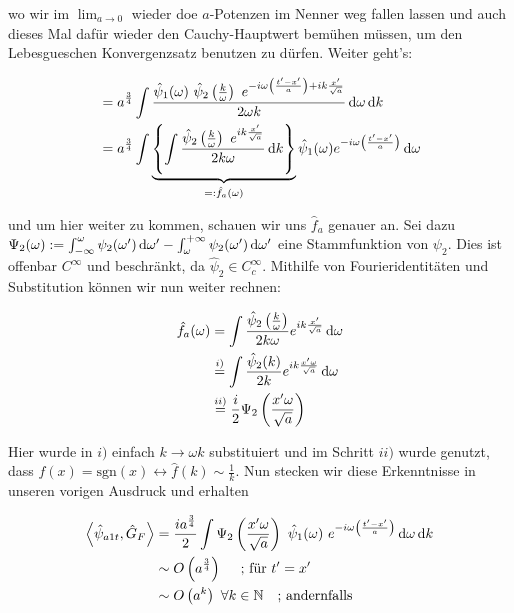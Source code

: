 wo wir im $\lim_{a \rightarrow 0}$ wieder doe $a$-Potenzen im Nenner weg fallen lassen
und auch dieses Mal dafür wieder den Cauchy-Hauptwert bemühen müssen, um den
Lebesgueschen Konvergenzsatz benutzen zu dürfen.
Weiter geht's:

\begin{align}
    &=
    a^\frac{3}{4} \int \frac{
    \hat \psi_1(\omega)
    ~\hat\psi_2 \left(\frac{k}{\omega}\right)
    ~ e^{-i \omega \left(\frac{t'-x'}{a}\right) + i k \frac{x'}{\sqrt{a}}}
    }
    {
    2\omega k
    } \mathop{}\!\mathrm{d} \omega \mathop{}\!\mathrm{d} k \nonumber \\
    &= a^\frac{3}{4} \int
    \underbrace{\left\{ \int \frac{\hat \psi_2\left(\frac{k}{\omega}\right)
        ~e^{ik\frac{x'}{\sqrt{a}}}
        }
        {
            2 k \omega
        }
        \mathop{}\!\mathrm{d} k
        \right\}}_{=: \hat f_a (\omega)}
    \hat \psi_1(\omega) e^{-i \omega \left(\frac{t'-x'}{a}\right)}
    \mathop{}\!\mathrm{d} \omega
\end{align}

und um hier weiter zu kommen, schauen wir uns $\hat f_a$ genauer an. Sei dazu
$\Psi_2(\omega) := \int_{-\infty}^\omega \psi_2(\omega ') \mathop{}\!\mathrm{d} \omega '
    -  \int_{\omega}^{+ \infty} \psi_2(\omega ') \mathop{}\!\mathrm{d} \omega '$ eine
Stammfunktion von $\psi_2$. Dies ist offenbar $C^\infty$ und beschränkt, da
 $\hat \psi_2 \in C^\infty_c$. Mithilfe von Fourieridentitäten und Substitution können wir nun weiter rechnen:

\begin{align*}
    \hat f_a (\omega) &=
    \int \frac{\hat \psi_2\left(\frac{k}{\omega}\right)}{2k\omega}
    e^{i k \frac{x'}{\sqrt{a}}}
    \mathop{}\!\mathrm{d} \omega \\
    &\stackrel{i)}{=}
    \int \frac{\hat \psi_2 (k)}{2k}e^{ik\frac{x' \omega}{\sqrt{a}}}
    \mathop{}\!\mathrm{d} \omega \\
    &\stackrel{ii)}{=} \frac{i}{2}  \Psi_2\left(\frac{x' \omega}{\sqrt{a}}\right)
\end{align*}

Hier wurde in $i)$ einfach $k \rightarrow \omega k$ substituiert und im Schritt $ii)$
wurde genutzt, dass $f(x) = \mathrm{sgn}(x) \leftrightarrow \hat f(k) \sim \frac{1}{k}$.
Nun stecken wir diese Erkenntnisse in unseren vorigen Ausdruck und erhalten

\begin{align}
 \left< \hat\psi_{a1t}, \hat G_F \right>
    &=
    \frac{i a^\frac{3}{4}}{2} \int \Psi_2\left(\frac{x' \omega}{\sqrt{a}}\right)
    ~\hat \psi_1(\omega)
    ~ e^{-i \omega \left(\frac{t'-x'}{a}\right)}
    \mathop{}\!\mathrm{d} \omega \mathop{}\!\mathrm{d} k
    \nonumber \\
    &\sim O\left(a^\frac{3}{4}\right) \kern 1em \textrm{ ; für } t'=x'
    \nonumber \\
    &\sim O\left(a^k\right) ~ \forall k \in \mathbb{N} \kern 1em \textrm{;   andernfalls}
\end{align}

